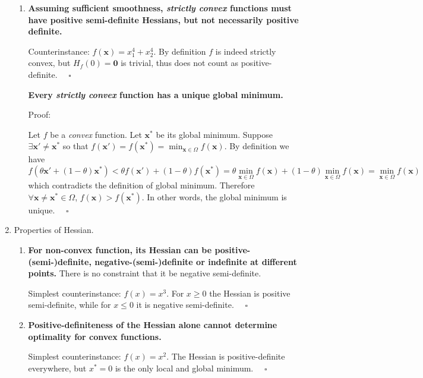 \documentclass[a4paper, 10pt]{article}
\begin{document}
\begin{enumerate}[label=(\alph*)]
\begin{enumerate}[label=(\arabic*)]
    \item \textbf{Assuming sufficient smoothness, \textit{strictly convex} functions must have positive semi-definite Hessians, but not necessarily positive definite.}
    
    Counterinstance: $f(\mathbf{x}) = x_1^4 + x_2^4$. By definition $f$ is indeed strictly convex, but $H_f(0) = \mathbf{0}$ is trivial, thus does not count as positive-definite. $\quad \square$
    
    \textbf{Every \textit{strictly convex} function has a unique global minimum.}
    
    Proof:
    
    Let $f$ be a \textit{convex} function. Let $\mathbf{x}^*$ be its global minimum. Suppose $\exists \mathbf{x}'\neq \mathbf{x}^*$ so that $f(\mathbf{x}') = f(\mathbf{x}^*) = \min_{\mathbf{x}\in \Omega} f(\mathbf{x})$. By definition we have
    \begin{equation}
        f(\theta \mathbf{x}' + (1-\theta) \mathbf{x}^*) < \theta f(\mathbf{x}') + (1-\theta) f(\mathbf{x}^*) = \theta \min_{\mathbf{x}\in \Omega} f(\mathbf{x}) + (1 - \theta)\min_{\mathbf{x}\in \Omega} f(\mathbf{x}) = \min_{\mathbf{x}\in \Omega} f(\mathbf{x})
    \end{equation}
    which contradicts the definition of global minimum. Therefore $\forall \mathbf{x}\neq \mathbf{x}^* \in \Omega$, $f(\mathbf{x}) > f(\mathbf{x}^*)$. In other words, the global minimum is unique. $\quad \square$
    
\end{enumerate}

\item Properties of Hessian.
\begin{enumerate}[label=(\arabic*)]
    \item \textbf{For non-convex function, its Hessian can be positive-(semi-)definite, negative-(semi-)definite or indefinite at different points.} There is no constraint that it be negative semi-definite.
    
    Simplest counterinstance: $f(x) = x^3$. For $x\geq 0$ the Hessian is positive semi-definite, while for $x\leq 0$ it is negative semi-definite. $\quad \square$
    
    \item \textbf{Positive-definiteness of the Hessian alone cannot determine optimality for convex functions.}
    
    Simplest counterinstance: $f(x) = x^2$. The Hessian is positive-definite everywhere, but $x^*=0$ is the only local and global minimum. $\quad \square$
    

\end{enumerate}
\end{enumerate}
\end{document}
